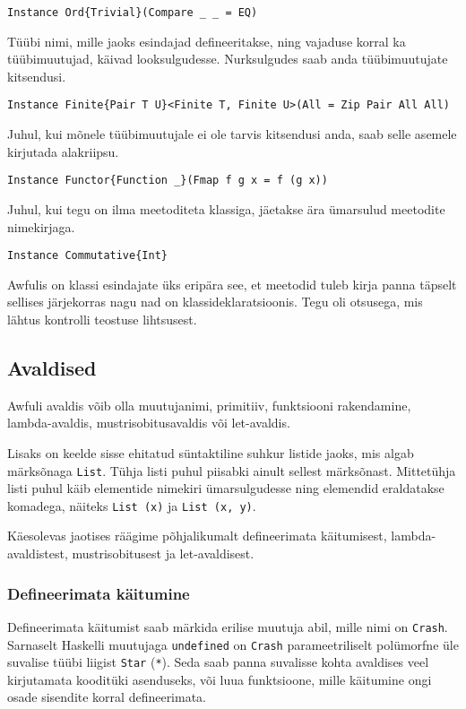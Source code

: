 \documentclass[12pt]{article}
\begin{document}
        \begin{verbatim}Instance Ord{Trivial}(Compare _ _ = EQ)\end{verbatim}

        Tüübi nimi, mille jaoks esindajad defineeritakse, ning vajaduse korral ka tüübimuutujad, käivad looksulgudesse. Nurksulgudes saab anda tüübimuutujate kitsendusi.

        \begin{verbatim}Instance Finite{Pair T U}<Finite T, Finite U>(All = Zip Pair All All)\end{verbatim}

        Juhul, kui mõnele tüübimuutujale ei ole tarvis kitsendusi anda, saab selle asemele kirjutada alakriipsu.

        \begin{verbatim}Instance Functor{Function _}(Fmap f g x = f (g x))\end{verbatim}

        Juhul, kui tegu on ilma meetoditeta klassiga, jäetakse ära ümarsulud meetodite nimekirjaga.

        \begin{verbatim}Instance Commutative{Int}\end{verbatim}

        Awfulis on klassi esindajate üks eripära see, et meetodid tuleb kirja panna täpselt sellises järjekorras nagu nad on klassideklaratsioonis. Tegu oli otsusega, mis lähtus kontrolli teostuse lihtsusest.
    \subsection{Avaldised}
      Awfuli avaldis võib olla muutujanimi, primitiiv, funktsiooni rakendamine, lambda-avaldis, mustrisobitusavaldis või let-avaldis.

      Lisaks on keelde sisse ehitatud süntaktiline suhkur listide jaoks, mis algab märksõnaga \verb!List!. Tühja listi puhul piisabki ainult sellest märksõnast. Mittetühja listi puhul käib elementide nimekiri ümarsulgudesse ning elemendid eraldatakse komadega, näiteks \verb!List (x)! ja \verb!List (x, y)!.

        Käesolevas jaotises räägime põhjalikumalt defineerimata käitumisest, lambda-avaldistest, mustrisobitusest ja let-avaldisest.
      \subsubsection{Defineerimata käitumine}
        Defineerimata käitumist saab märkida erilise muutuja abil, mille nimi on \verb!Crash!. Sarnaselt Haskelli muutujaga \verb!undefined! on \verb!Crash! parameetriliselt polümorfne üle suvalise tüübi liigist \verb!Star! (\verb!*!). Seda saab panna suvalisse kohta avaldises veel kirjutamata kooditüki asenduseks, või luua funktsioone, mille käitumine ongi osade sisendite korral defineerimata.
\end{document}
